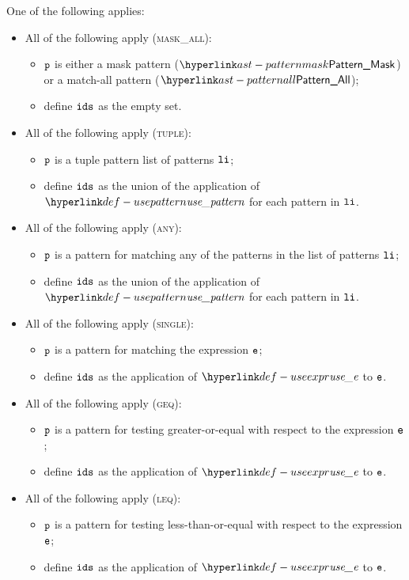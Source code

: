 \ProseParagraph
One of the following applies:
\begin{itemize}
  \item All of the following apply (\textsc{mask\_all}):
  \begin{itemize}
    \item $\texttt{p}$ is either a mask pattern ($\PatternMask$) or a match-all pattern ($\PatternAll$);
    \item define $\texttt{ids}$ as the empty set.
  \end{itemize}

  \item All of the following apply (\textsc{tuple}):
  \begin{itemize}
    \item $\texttt{p}$ is a tuple pattern list of patterns $\texttt{li}$;
    \item define $\texttt{ids}$ as the union of the application of $\usepattern$ for each pattern in $\texttt{li}$.
  \end{itemize}

  \item All of the following apply (\textsc{any}):
  \begin{itemize}
    \item $\texttt{p}$ is a pattern for matching any of the patterns in the list of patterns $\texttt{li}$;
    \item define $\texttt{ids}$ as the union of the application of $\usepattern$ for each pattern in $\texttt{li}$.
  \end{itemize}

  \item All of the following apply (\textsc{single}):
  \begin{itemize}
    \item $\texttt{p}$ is a pattern for matching the expression $\texttt{e}$;
    \item define $\texttt{ids}$ as the application of $\useexpr$ to $\texttt{e}$.
  \end{itemize}

  \item All of the following apply (\textsc{geq}):
  \begin{itemize}
    \item $\texttt{p}$ is a pattern for testing greater-or-equal with respect to the expression $\texttt{e}$;
    \item define $\texttt{ids}$ as the application of $\useexpr$ to $\texttt{e}$.
  \end{itemize}

  \item All of the following apply (\textsc{leq}):
  \begin{itemize}
    \item $\texttt{p}$ is a pattern for testing less-than-or-equal with respect to the expression $\texttt{e}$;
    \item define $\texttt{ids}$ as the application of $\useexpr$ to $\texttt{e}$.
  \end{itemize}


\end{itemize}
